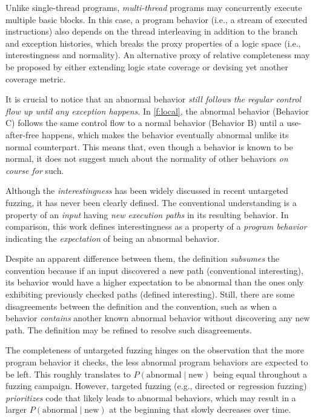 \documentclass[letterpaper,twocolumn,10pt]{article}
\begin{document}
%
Unlike single-thread programs, \emph{multi-thread} programs may concurrently
execute multiple basic blocks. In this case, a program behavior (i.e., a stream
of executed instructions) also depends on the thread interleaving in
addition to the branch and exception histories, which breaks the proxy
properties of a logic space (i.e., interestingness and normality).
An alternative proxy of relative completeness may be proposed by either
extending logic state coverage or devising yet another coverage metric.

%
It is crucial to notice that an abnormal behavior \emph{still follows the
regular control flow up until any exception happens}. In \autoref{f:local}, the
abnormal behavior (Behavior C) follows the same control flow to a normal
behavior (Behavior B) until a use-after-free happens, which makes the behavior
eventually abnormal unlike its normal counterpart. This means that, even though
a behavior is known to be normal, it does not suggest much about the normality
of other behaviors \emph{on course for} such.


%
Although the \emph{interestingness} has been widely discussed in recent
untargeted fuzzing, it has never been clearly defined. The conventional
understanding is a property of an \emph{input} having \emph{new
execution paths} in its resulting behavior. In comparison, this work
defines interestingness as a property of a \emph{program behavior} indicating 
the \emph{expectation} of being an abnormal behavior. 

Despite an apparent difference between them, the definition \emph{subsumes} the
convention because if an input discovered a new path (conventional
interesting), its behavior would have a higher expectation to be abnormal than
the ones only exhibiting previously checked paths (defined interesting). 
%
Still, there are some disagreements between the definition and the convention,
such as when a behavior \emph{contains} another known abnormal behavior without
discovering any new path. The definition may be refined to resolve such
disagreements.

%
The completeness of untargeted fuzzing hinges on the observation that the more
program behavior it checks, the less abnormal program behaviors are expected to
be left. This roughly translates to $P(\mathrm{abnormal} \mid \mathrm{new})$
being equal throughout a fuzzing campaign.
%
However, targeted fuzzing (e.g., directed or regression fuzzing)
\emph{prioritizes} code that likely leads to abnormal behaviors, which may result
in a larger $P(\mathrm{abnormal} \mid \mathrm{new})$ at the beginning that slowly
decreases over time. 
\end{document}
